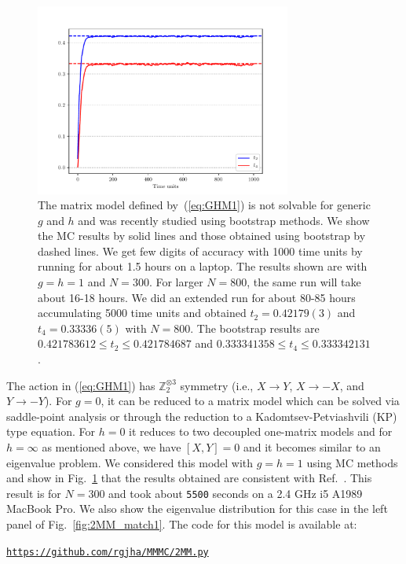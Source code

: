 \documentclass[letter,11pt]{article}
\begin{document}
\begin{figure}[htbp] 
	\centering 
	\includegraphics[width=0.75\textwidth]{figs/plot_2MM_sym1.pdf}
	\caption{\label{fig:2MM_match}The matrix model defined by~(\ref{eq:GHM1}) is not solvable for generic $g$ and $h$ and was recently studied using bootstrap methods. We show the MC results by solid lines and those obtained using bootstrap by dashed lines. We get few digits of accuracy with 1000 time units by running for about 1.5 hours on a laptop. The results shown are with $g=h=1$ and $N=300$. For larger $N=800$, the same run will take about 16-18 hours. We did an extended run for about 80-85 hours accumulating 5000 time units and obtained $t_{2} = 0.42179(3) $ and $t_{4}=0.33336(5)$ with $N=800$. The bootstrap results are $0.421783612 \le t_{2} \le 0.421784687$ and $0.333341358 \le t_{4} \le 0.333342131$ \cite{Kazakov:2021lel}. }
\end{figure} 

The action in (\ref{eq:GHM1}) has $\mathbb{Z}_{2}^{\otimes 3}$ symmetry 
(i.e., $X \to Y$, $X \to -X$, and $Y \to -Y$). For $g = 0$, it can be reduced to a
matrix model which can be solved via saddle-point analysis or through the reduction 
to a Kadomtsev-Petviashvili (KP) type equation. 
For $h = 0$ it reduces to two decoupled one-matrix models 
and for $h = \infty$ as mentioned above, we have $[X, Y] = 0$ and it becomes similar to an eigenvalue problem. 
We considered this model with $g=h=1$ using MC methods and show in Fig.~\ref{fig:2MM_match} that the results obtained are consistent with Ref.~\cite{Kazakov:2021lel}. 
This result is for $N = 300$ and took about \texttt{5500} seconds on a 2.4 GHz i5 A1989 MacBook Pro. We also show the eigenvalue distribution for this case in the left panel of Fig.~\ref{fig:2MM_match1}. The code for this model is available at:  
\begin{center} 
	\texttt{\href{https://github.com/rgjha/MMMC/blob/main/2MM.py}{https://github.com/rgjha/MMMC/2MM.py}}
 \end{center}
\end{document}
